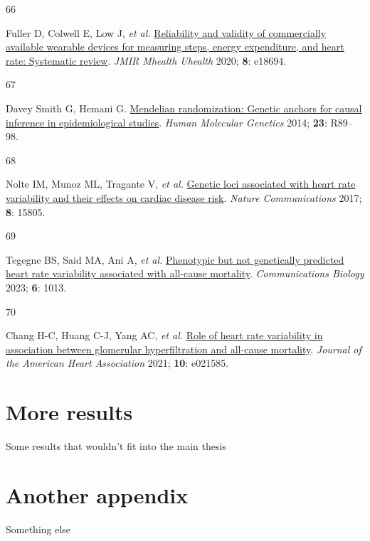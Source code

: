 \documentclass[
  a4paper,
  headsepline=true,
  open=any]{scrbook}
\newlength{\cslhangindent}
\newlength{\csllabelwidth}
\newlength{\cslentryspacingunit} %
\newenvironment{CSLReferences}[2] %
 {%
  \setlength{\parindent}{0pt}
  \ifodd #1
  \let\oldpar\par
  \def\par{\hangindent=\cslhangindent\oldpar}
  \fi
  \setlength{\parskip}{#2\cslentryspacingunit}
 }%
 {}
\newcommand{\CSLLeftMargin}[1]{\parbox[t]{\csllabelwidth}{#1}}
\newcommand{\CSLRightInline}[1]{\parbox[t]{\linewidth - \csllabelwidth}{#1}\break}
\begin{document}
\begin{CSLReferences}{0}{0}
\leavevmode{}%
\CSLLeftMargin{66 }%
\CSLRightInline{Fuller D, Colwell E, Low J, \emph{et al.}
\href{https://doi.org/10.2196/18694}{Reliability and validity of
commercially available wearable devices for measuring steps, energy
expenditure, and heart rate: Systematic review}. \emph{JMIR Mhealth
Uhealth} 2020; \textbf{8}: e18694.}

\leavevmode{}%
\CSLLeftMargin{67 }%
\CSLRightInline{Davey Smith G, Hemani G.
\href{https://doi.org/10.1093/hmg/ddu328}{Mendelian randomization:
Genetic anchors for causal inference in epidemiological studies}.
\emph{Human Molecular Genetics} 2014; \textbf{23}: R89--98.}

\leavevmode{}%
\CSLLeftMargin{68 }%
\CSLRightInline{Nolte IM, Munoz ML, Tragante V, \emph{et al.}
\href{https://doi.org/10.1038/ncomms15805}{Genetic loci associated with
heart rate variability and their effects on cardiac disease risk}.
\emph{Nature Communications} 2017; \textbf{8}: 15805.}

\leavevmode{}%
\CSLLeftMargin{69 }%
\CSLRightInline{Tegegne BS, Said MA, Ani A, \emph{et al.}
\href{https://doi.org/10.1038/s42003-023-05376-y}{Phenotypic but not
genetically predicted heart rate variability associated with all-cause
mortality}. \emph{Communications Biology} 2023; \textbf{6}: 1013.}

\leavevmode{}%
\CSLLeftMargin{70 }%
\CSLRightInline{Chang H-C, Huang C-J, Yang AC, \emph{et al.}
\href{https://doi.org/10.1161/JAHA.121.021585}{Role of heart rate
variability in association between glomerular hyperfiltration and
all{-}cause mortality}. \emph{Journal of the American Heart Association}
2021; \textbf{10}: e021585.}

\end{CSLReferences}

\cleardoublepage
{}
{}
\appendix

\hypertarget{sec-more-results}{%
\chapter{More results}\label{sec-more-results}}

Some results that wouldn't fit into the main thesis

\hypertarget{another-appendix}{%
\chapter{Another appendix}\label{another-appendix}}

Something else


\backmatter
\end{document}
